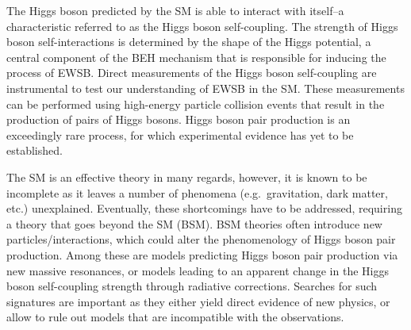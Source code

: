 
The Higgs boson predicted by the SM is able to interact with itself--a
characteristic referred to as the Higgs boson self-coupling. The strength of
Higgs boson self-interactions is determined by the shape of the Higgs potential,
a central component of the BEH mechanism that is responsible for inducing the
process of EWSB.
Direct measurements of the Higgs boson self-coupling are instrumental to test
our understanding of EWSB in the SM. These measurements can be performed using
high-energy particle collision events that result in the production of pairs of
Higgs bosons. Higgs boson pair production is an exceedingly rare process, for
which experimental evidence has yet to be established.

The SM is an effective theory in many regards, however, it is known to be
incomplete as it leaves a number of phenomena (e.g.\ gravitation, dark matter,
etc.) unexplained. Eventually, these shortcomings have to be addressed,
requiring a theory that goes beyond the SM (BSM). BSM theories often introduce
new particles/interactions, which could alter the phenomenology of Higgs boson
pair production. Among these are models predicting Higgs boson pair production
via new massive resonances, or models leading to an apparent change in the Higgs
boson self-coupling strength through radiative corrections. Searches for such
signatures are important as they either yield direct evidence of new physics, or
allow to rule out models that are incompatible with the observations.

